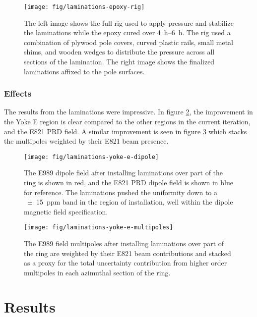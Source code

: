 \begin{figure}
\texttt{[image: fig/laminations-epoxy-rig]}
\caption{
    The left image shows the full rig used to apply pressure and stabilize the laminations while the epoxy cured over \SIrange{4}{6}{\hour}.  The rig used a combination of plywood pole covers, curved plastic rails, small metal shims, and wooden wedges to distribute the pressure across all sections of the lamination.  The right image shows the finalized laminations affixed to the pole surfaces.
    \label{fig:laminations-epoxy-rig}
}
\end{figure}

\subsubsection{Effects}

The results from the laminations were impressive.  In figure \ref{fig:laminations-yoke-e-dipole}, the improvement in the Yoke E region is clear compared to the other regions in the current iteration, and the E821 PRD field.  A similar improvement is seen in figure \ref{fig:laminations-yoke-e-multipoles} which stacks the multipoles weighted by their E821 beam presence.

\begin{figure}
\centering
\texttt{[image: fig/laminations-yoke-e-dipole]}
\caption{
    The E989 dipole field after installing laminations over part of the ring is shown in red, and the E821 PRD dipole field is shown in blue for reference.  The laminations pushed the uniformity down to a \SI{\pm15}{ppm} band in the region of installation, well within the dipole magnetic field specification.
    \label{fig:laminations-yoke-e-dipole}
}
\end{figure}

\begin{figure}
\centering
\texttt{[image: fig/laminations-yoke-e-multipoles]}
\caption{
    The E989 field multipoles after installing laminations over part of the ring are weighted by their E821 beam contributions and stacked as a proxy for the total uncertainty contribution from higher order multipoles in each azimuthal section of the ring. 
    \label{fig:laminations-yoke-e-multipoles}
}
\end{figure}

\section{Results}


